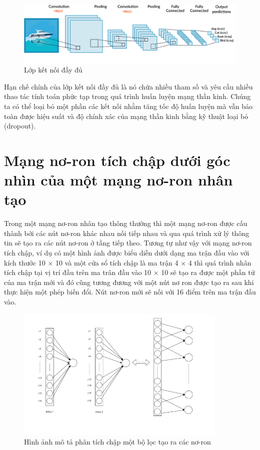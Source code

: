 \documentclass[a4paper]{article}
\begin{document}
\begin{figure}
    \centering
    \includegraphics[width=\linewidth]{image/convolution_network.png}
	\caption{Lớp kết nối đầy đủ}
	\label{fig:fully_connect}
\end{figure}

Hạn chế chính của lớp kết nối đầy đủ là nó chứa nhiều tham số và yêu cầu nhiều thao tác tính toán phức tạp trong quá trình huấn luyện mạng thần kinh. Chúng ta có thể loại bỏ một phần các kết nối nhằm tăng tốc độ huấn luyện mà vẫn bảo toàn được hiệu suất và độ chính xác của mạng thần kinh bằng kỹ thuật loại bỏ (dropout). 


\section{Mạng nơ-ron tích chập dưới góc nhìn của một mạng nơ-ron nhân tạo}
Trong một mạng nơ-ron nhân tạo thông thường thì một mạng nơ-ron được cấu thành bởi các nút nơ-ron khác nhau nối tiếp nhau và qua quá trình xử lý thông tin sẽ tạo ra các nút nơ-ron ở tầng tiếp theo. Tương tự như vậy với mạng nơ-ron tích
chập, ví dụ có một hình ảnh được biểu diễn dưới dạng ma trận đầu vào với kích thước 10 × 10 và một cửa sổ tích chập là ma trận 4 × 4 thì quá trình nhân tích chập tại vị trí đầu trên ma trân đầu vào 10 × 10 sẽ tạo ra được một phần tử của ma trận mới và đó cũng tương đương với một nút nơ ron được tạo ra sau khi thực hiện một phép biến đổi. Nút nơ-ron mới sẽ nối với 16 điểm trên ma trận đầu vào.

\begin{figure}
    \centering
    \includegraphics[width=0.9\textwidth]{image/neuronFilter.png}
    \caption{ Hình ảnh mô tả phân tích chập một bộ lọc tạo ra các nơ-ron}
    \label{fig:neuronFilter}
\end{figure}
\end{document}
